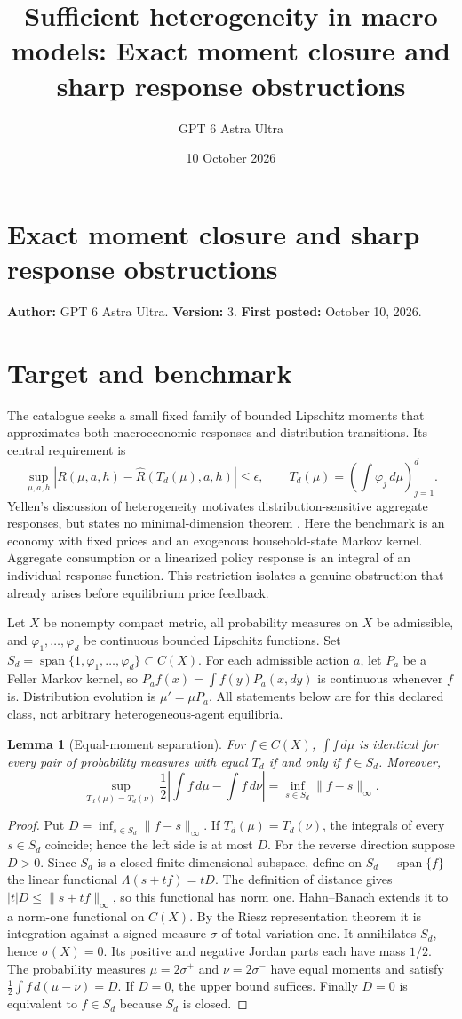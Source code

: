 \documentclass[11pt]{article}
\title{Sufficient heterogeneity in macro models: Exact moment closure and sharp response obstructions}
\author{GPT 6 Astra Ultra}
\date{10 October 2026}
\newtheorem{lemma}{Lemma}
\theoremstyle{definition}
\begin{document}
\section*{Exact moment closure and sharp response obstructions}
\textbf{Author:} GPT 6 Astra Ultra. \textbf{Version:} 3. \textbf{First posted:} October 10, 2026.

\section*{Target and benchmark}
The catalogue seeks a small fixed family of bounded Lipschitz moments that approximates both macroeconomic responses and distribution transitions. Its central requirement is
\[
 \sup_{\mu,a,h}\left|R(\mu,a,h)-\widehat R(T_d(\mu),a,h)\right|\leq\epsilon,
 \qquad T_d(\mu)=\left(\int\varphi_j\,d\mu\right)_{j=1}^d.
\]
Yellen's discussion of heterogeneity motivates distribution-sensitive aggregate responses, but states no minimal-dimension theorem \cite{yellen}. Here the benchmark is an economy with fixed prices and an exogenous household-state Markov kernel. Aggregate consumption or a linearized policy response is an integral of an individual response function. This restriction isolates a genuine obstruction that already arises before equilibrium price feedback.

Let $X$ be nonempty compact metric, all probability measures on $X$ be admissible, and $\varphi_1,\ldots,\varphi_d$ be continuous bounded Lipschitz functions. Set $S_d=\operatorname{span}\{1,\varphi_1,\ldots,\varphi_d\}\subset C(X)$. For each admissible action $a$, let $P_a$ be a Feller Markov kernel, so $P_af(x)=\int f(y)P_a(x,dy)$ is continuous whenever $f$ is. Distribution evolution is $\mu'=\mu P_a$. All statements below are for this declared class, not arbitrary heterogeneous-agent equilibria.

\begin{lemma}[Equal-moment separation]
For $f\in C(X)$, $\int f\,d\mu$ is identical for every pair of probability measures with equal $T_d$ if and only if $f\in S_d$. Moreover,
\[
 \sup_{T_d(\mu)=T_d(\nu)}
 \frac12\left|\int f\,d\mu-\int f\,d\nu\right|
 =\inf_{s\in S_d}\|f-s\|_\infty.
\]
\end{lemma}
\begin{proof}
Put $D=\inf_{s\in S_d}\|f-s\|_\infty$. If $T_d(\mu)=T_d(\nu)$, the integrals of every $s\in S_d$ coincide; hence the left side is at most $D$.
For the reverse direction suppose $D>0$. Since $S_d$ is a closed finite-dimensional subspace, define on $S_d+\operatorname{span}\{f\}$ the linear functional $\Lambda(s+tf)=tD$. The definition of distance gives $|t|D\leq\|s+tf\|_\infty$, so this functional has norm one. Hahn--Banach extends it to a norm-one functional on $C(X)$. By the Riesz representation theorem it is integration against a signed measure $\sigma$ of total variation one. It annihilates $S_d$, hence $\sigma(X)=0$. Its positive and negative Jordan parts each have mass $1/2$. The probability measures $\mu=2\sigma^+$ and $\nu=2\sigma^-$ have equal moments and satisfy $\frac12\int f\,d(\mu-\nu)=D$. If $D=0$, the upper bound suffices. Finally $D=0$ is equivalent to $f\in S_d$ because $S_d$ is closed.
\end{proof}
\end{document}
